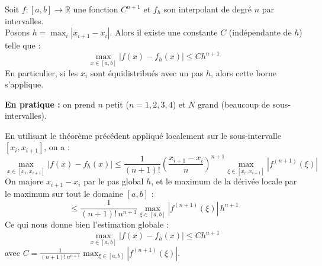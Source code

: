 \begin{theoreme}
Soit $f : [a,b] \to \mathbb{R}$ une fonction $C^{n+1}$ et $f_h$ son interpolant de degré $n$ par intervalles. \\
Posons $h = \max_i |x_{i+1} - x_i|$. Alors il existe une constante $C$ (indépendante de $h$) telle que :
$$\max_{x\in[a,b]} |f(x) - f_h(x)| \le C h^{n+1}$$
En particulier, si les $x_i$ sont équidistribués avec un pas $h$, alors cette borne s'applique.
\end{theoreme}

\textbf{En pratique :} on prend $n$ petit ($n = 1, 2, 3, 4$) et $N$ grand (beaucoup de sous-intervalles).

\begin{explication}
En utilisant le théorème précédent appliqué localement sur le sous-intervalle $[x_i, x_{i+1}]$, on a :
$$\max_{x\in[x_i, x_{i+1}]} |f(x) - f_h(x)| \le \frac{1}{(n+1)!} \left(\frac{x_{i+1}-x_i}{n}\right)^{n+1} \max_{\xi \in [x_i, x_{i+1}]} |f^{(n+1)}(\xi)|$$
On majore $x_{i+1}-x_i$ par le pas global $h$, et le maximum de la dérivée locale par le maximum sur tout le domaine $[a,b]$ :
$$\le \frac{1}{(n+1)! \, n^{n+1}} \max_{\xi\in[a,b]} |f^{(n+1)}(\xi)| \, h^{n+1}$$
Ce qui nous donne bien l'estimation globale :
$$\max_{x\in[a,b]} |f(x) - f_h(x)| \le C h^{n+1}$$
avec $C = \frac{1}{(n+1)! \, n^{n+1}} \max_{\xi\in[a,b]} |f^{(n+1)}(\xi)|$.
\end{explication}